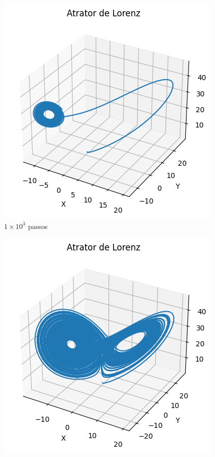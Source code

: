 \begin{frame}
\begin{figure}[htbp]
\begin{minipage}{0.32\textwidth}
            \includegraphics[width=\linewidth]{01_docs/00_Relatorio/img/attrator1000.png}
            \vspace{0.5em} %
            {\scriptsize $1 \times 10^3$ passos}
        \end{minipage}\hfill
        \begin{minipage}{0.32\textwidth}
            \centering
            \includegraphics[width=\linewidth]{01_docs/00_Relatorio/img/attrator10000.png}

\end{minipage}
\end{figure}
\end{frame}
